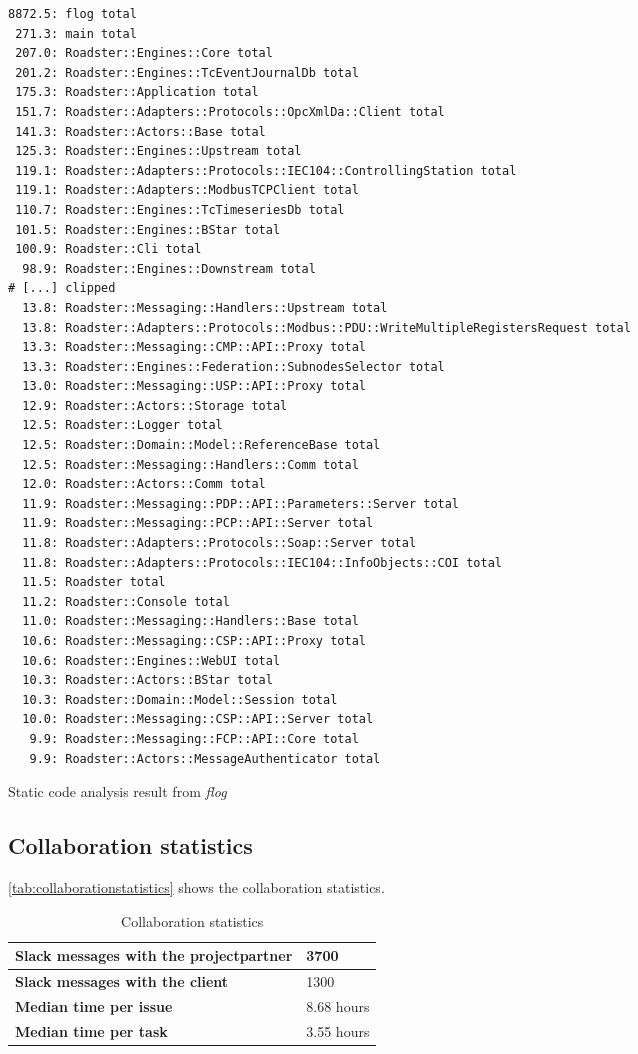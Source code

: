 \begin{listing}[H]
	\begin{verbatim}
8872.5: flog total
 271.3: main total
 207.0: Roadster::Engines::Core total
 201.2: Roadster::Engines::TcEventJournalDb total
 175.3: Roadster::Application total
 151.7: Roadster::Adapters::Protocols::OpcXmlDa::Client total
 141.3: Roadster::Actors::Base total
 125.3: Roadster::Engines::Upstream total
 119.1: Roadster::Adapters::Protocols::IEC104::ControllingStation total
 119.1: Roadster::Adapters::ModbusTCPClient total
 110.7: Roadster::Engines::TcTimeseriesDb total
 101.5: Roadster::Engines::BStar total
 100.9: Roadster::Cli total
  98.9: Roadster::Engines::Downstream total
# [...] clipped
  13.8: Roadster::Messaging::Handlers::Upstream total
  13.8: Roadster::Adapters::Protocols::Modbus::PDU::WriteMultipleRegistersRequest total
  13.3: Roadster::Messaging::CMP::API::Proxy total
  13.3: Roadster::Engines::Federation::SubnodesSelector total
  13.0: Roadster::Messaging::USP::API::Proxy total
  12.9: Roadster::Actors::Storage total
  12.5: Roadster::Logger total
  12.5: Roadster::Domain::Model::ReferenceBase total
  12.5: Roadster::Messaging::Handlers::Comm total
  12.0: Roadster::Actors::Comm total
  11.9: Roadster::Messaging::PDP::API::Parameters::Server total
  11.9: Roadster::Messaging::PCP::API::Server total
  11.8: Roadster::Adapters::Protocols::Soap::Server total
  11.8: Roadster::Adapters::Protocols::IEC104::InfoObjects::COI total
  11.5: Roadster total
  11.2: Roadster::Console total
  11.0: Roadster::Messaging::Handlers::Base total
  10.6: Roadster::Messaging::CSP::API::Proxy total
  10.6: Roadster::Engines::WebUI total
  10.3: Roadster::Actors::BStar total
  10.3: Roadster::Domain::Model::Session total
  10.0: Roadster::Messaging::CSP::API::Server total
   9.9: Roadster::Messaging::FCP::API::Core total
   9.9: Roadster::Actors::MessageAuthenticator total
	\end{verbatim}
	\caption{Static code analysis result from \emph{flog}}
	\label{lst:metrics:flog}
\end{listing}

\subsection{Collaboration statistics}
\autoref{tab:collaborationstatistics} shows the collaboration statistics.
\begin{table}[H]
  \centering
  \begin{tabular}{|m{60mm}|m{20mm}|}
	\hline
	\bf Slack messages with the projectpartner & 3700 \\
	\hline
	\bf Slack messages with the client & 1300 \\
	\hline
	\bf Median time per issue  & 8.68 hours \\
	\hline
	\bf Median time per task & 3.55 hours \\
    \hline
  \end{tabular} \\
  \caption{Collaboration statistics}
  \label{tab:collaborationstatistics}
\end{table}

